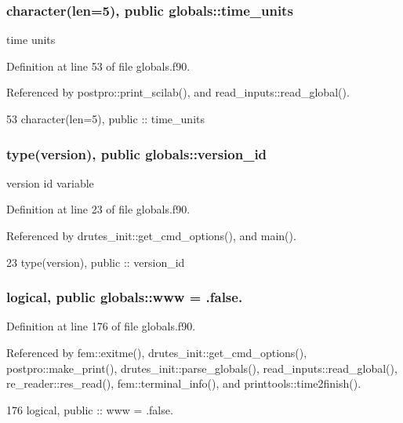 \subsubsection[{time\+\_\+units}]{\setlength{\rightskip}{0pt plus 5cm}character(len=5), public globals\+::time\+\_\+units}\label{namespaceglobals_a9b6e5780b5e94cf5d7dbb768fedac60d}


time units 



Definition at line 53 of file globals.\+f90.



Referenced by postpro\+::print\+\_\+scilab(), and read\+\_\+inputs\+::read\+\_\+global().


\begin{DoxyCode}
53   \textcolor{keywordtype}{character(len=5)}, \textcolor{keywordtype}{public} :: time_units
\end{DoxyCode}
\subsubsection[{version\+\_\+id}]{\setlength{\rightskip}{0pt plus 5cm}type({\bf version}), public globals\+::version\+\_\+id}\label{namespaceglobals_ad74d7a48f287287c17ef36720d1579d5}


version id variable 



Definition at line 23 of file globals.\+f90.



Referenced by drutes\+\_\+init\+::get\+\_\+cmd\+\_\+options(), and main().


\begin{DoxyCode}
23   \textcolor{keywordtype}{type}(version), \textcolor{keywordtype}{public} :: version_id   
\end{DoxyCode}
\subsubsection[{www}]{\setlength{\rightskip}{0pt plus 5cm}logical, public globals\+::www = .false.}\label{namespaceglobals_a9fdc0884cd3e883289e14207ab17ba82}


Definition at line 176 of file globals.\+f90.



Referenced by fem\+::exitme(), drutes\+\_\+init\+::get\+\_\+cmd\+\_\+options(), postpro\+::make\+\_\+print(), drutes\+\_\+init\+::parse\+\_\+globals(), read\+\_\+inputs\+::read\+\_\+global(), re\+\_\+reader\+::res\+\_\+read(), fem\+::terminal\+\_\+info(), and printtools\+::time2finish().


\begin{DoxyCode}
176   \textcolor{keywordtype}{logical}, \textcolor{keywordtype}{public} :: www = .false.
\end{DoxyCode}
